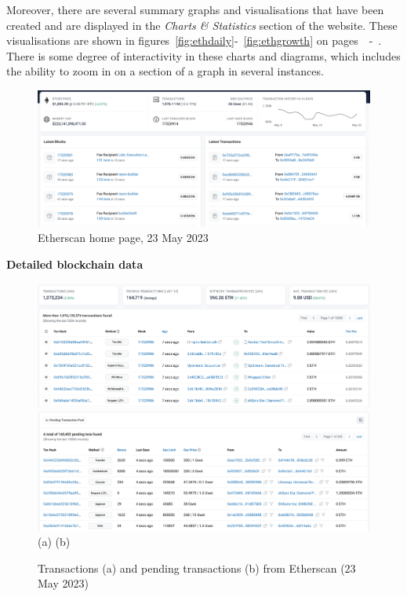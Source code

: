 \documentclass[UTF8]{article}
\begin{document}
Moreover, there are several summary graphs and visualisations that have been created and are displayed in the \textit{Charts \& Statistics} section of the website. These visualisations are shown in figures~\ref{fig:ethdaily}-~\ref{fig:ethgrowth} on pages~\pageref{fig:ethdaily}~-~\pageref{fig:ethgrowth}. There is some degree of interactivity in these charts and diagrams, which includes the ability to zoom in on a section of a graph in several instances.\\

\begin{figure}[htbp]
\begin{center}
\includegraphics[width=\linewidth]{images/etherscan}
\caption{Etherscan home page, 23 May 2023}
\label{fig:ethscan}
\end{center}
\end{figure}


\textbf{Detailed blockchain data}\\
\begin{figure}[htbp]
\begin{center}
\includegraphics[width=0.48\linewidth]{images/txns}
\includegraphics[width=0.48\linewidth]{images/pendtxns} \\
(a)\hspace{160pt}        (b)\\
\caption{Transactions (a) and pending transactions (b) from Etherscan (23 May 2023)}
\label{fig:txns}
\end{center}
\end{figure}
\end{document}
